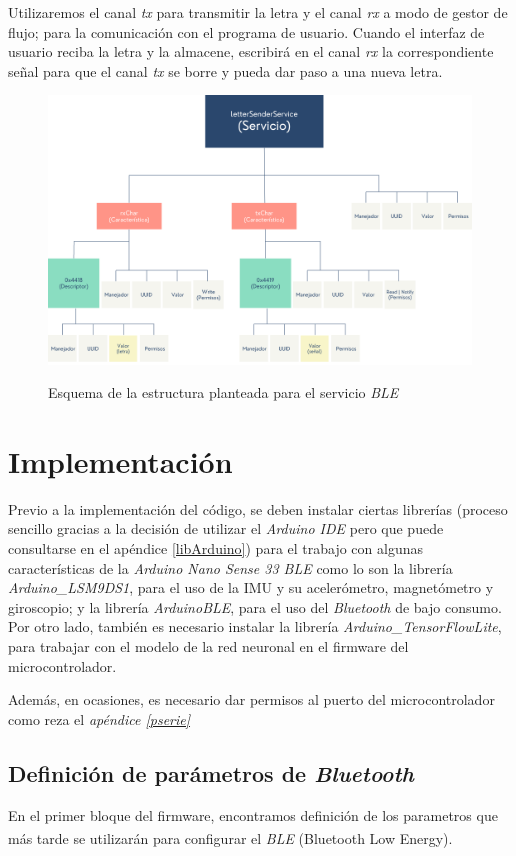 Utilizaremos el canal \textit{tx} para transmitir la letra y el canal \textit{rx}
a modo de gestor de flujo; para la comunicación con el programa de usuario. Cuando
el interfaz de usuario reciba la letra y la almacene, escribirá en el canal
\textit{rx} la correspondiente señal para que el canal \textit{tx} se borre
y pueda dar paso a una nueva letra.

\begin{figure}[h]
    \centering
    \includegraphics[width=1\textwidth]{capturas/BleLetterSenderService.png}\\[-0,40cm]
    \caption{Esquema de la estructura planteada para el servicio \textit{BLE}}
\end{figure}

\section{Implementación}
Previo a la implementación del código, se deben instalar ciertas librerías
(proceso sencillo gracias a la decisión de utilizar el \textit{Arduino IDE}
pero que puede consultarse en el apéndice \ref{libArduino})
para el trabajo con algunas características de la \textit{Arduino Nano Sense 33 BLE}
como lo son la librería \textit{Arduino\_LSM9DS1}, para el uso de la IMU y su
acelerómetro, magnetómetro y giroscopio; y la librería \textit{ArduinoBLE},
para el uso del \textit{Bluetooth} de bajo consumo. Por otro lado, también
es necesario instalar la librería \textit{Arduino\_TensorFlowLite}, para
trabajar con el modelo de la red neuronal en el firmware del microcontrolador.

Además, en ocasiones, es necesario dar permisos al puerto del microcontrolador
como reza el \textit{apéndice \ref{pserie}}
\subsection{Definición de parámetros de \textit{Bluetooth}}
En el primer bloque del firmware, encontramos definición de los parametros
que más tarde se utilizarán para configurar el \textit{BLE}
(Bluetooth Low Energy)\textsuperscript{\cite{ladvien}}\label{paramBT}.


